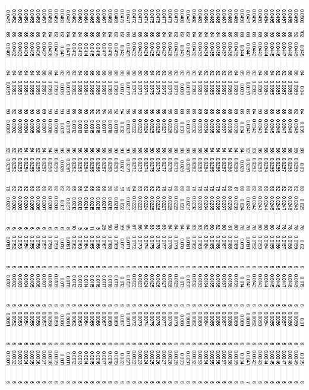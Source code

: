 \documentclass{article}
\begin{document}
\begin{center}
 \includegraphics[keepaspectratio,scale=0.85]{111_2000/005to000RSpinChart.png}
\end{center}
\clearpage
\end{document}
